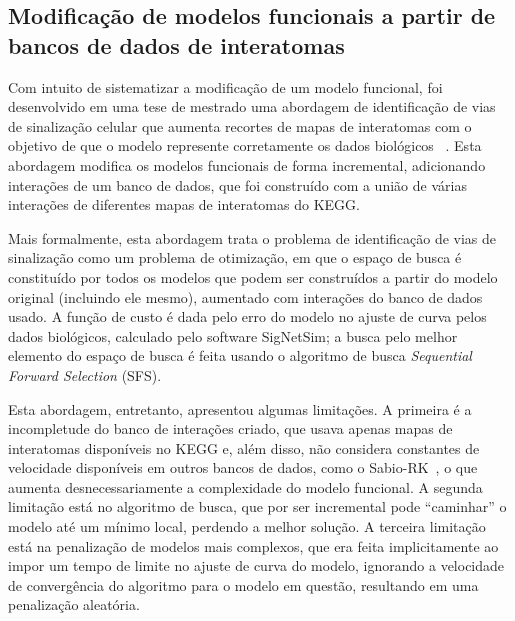 \documentclass[12pt]{article}
\begin{document}

\subsection{Modificação de modelos funcionais a partir de bancos de 
dados de interatomas}
Com intuito de sistematizar a modificação de um modelo funcional, foi
desenvolvido em uma tese de mestrado uma abordagem de identificação de
vias de sinalização celular que aumenta recortes de mapas de interatomas
com o objetivo de que o modelo represente corretamente os dados 
biológicos ~\cite{Wu2015metodo}. Esta abordagem modifica os modelos 
funcionais de forma incremental, adicionando interações de um banco de 
dados, que foi construído com a união de várias interações de diferentes 
mapas de interatomas do KEGG.

Mais formalmente, esta abordagem trata o problema de identificação de 
vias de sinalização como um problema de otimização, em que o espaço de
busca é constituído por todos os modelos que podem ser construídos a 
partir do modelo original (incluindo ele mesmo), aumentado com
interações do banco de dados usado. A função de custo é dada pelo erro
do modelo no ajuste de curva pelos dados biológicos, calculado pelo 
software SigNetSim; a busca pelo melhor elemento do espaço de busca é 
feita usando o algoritmo de busca {\it Sequential Forward Selection} 
(SFS).


Esta abordagem, entretanto, apresentou algumas limitações. A
primeira é a incompletude do banco de interações criado, que usava 
apenas mapas de interatomas disponíveis no KEGG e, além disso, não 
considera constantes de velocidade disponíveis em outros bancos de 
dados, como o Sabio-RK~\cite{doi:10.1093/nar/gkr1046}, o que aumenta 
desnecessariamente a complexidade do modelo funcional. A segunda 
limitação está no algoritmo de busca, que por ser incremental pode 
``caminhar'' o modelo até um mínimo local, perdendo a melhor solução. A
terceira limitação está na penalização de modelos mais complexos, que 
era feita implicitamente ao impor um tempo de limite no ajuste de curva 
do modelo, ignorando a velocidade de convergência do algoritmo para o 
modelo em questão, resultando em uma penalização aleatória.


\end{document}
